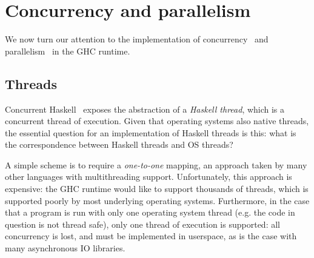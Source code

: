\section{Concurrency and parallelism}

We now turn our attention to the implementation of
concurrency~\cite{PeytonJones:1996:CH:237721.237794} and
parallelism~\cite{Harris:2005:HSM:1088348.1088354} in the GHC runtime.



\subsection{Threads}

Concurrent Haskell~\cite{PeytonJones:1996:CH:237721.237794} exposes the
abstraction of a \emph{Haskell thread}, which is a concurrent thread of
execution.  Given that operating systems also native threads, the
essential question for an implementation of Haskell threads is this:
what is the correspondence between Haskell threads and OS threads?

A simple scheme is to require a \emph{one-to-one} mapping, an approach
taken by many other languages with multithreading support.
Unfortunately, this approach is expensive: the GHC runtime would like to
support thousands of threads, which is supported poorly by most
underlying operating systems.  Furthermore, in the case that a program
is run with only one operating system thread (e.g. the code in question
is not thread safe), only one thread of execution is supported: all
concurrency is lost, and must be implemented in userspace, as is the
case with many asynchronous IO libraries.

